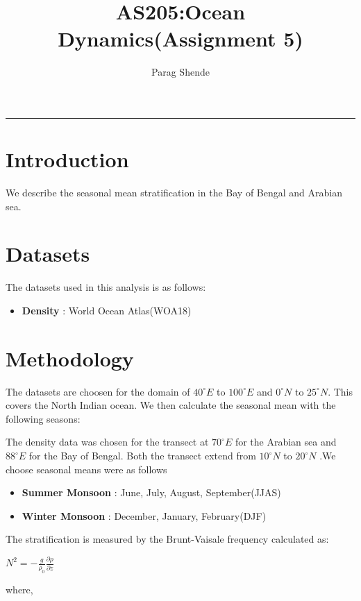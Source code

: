 \documentclass[20pt]{article}
\title{AS205:Ocean Dynamics(Assignment 5)}
\author{Parag Shende}
\begin{document}
\maketitle
\hrule

\section*{Introduction}

We describe the seasonal mean stratification in the Bay of Bengal and Arabian sea. 

\section*{Datasets}

The datasets used in this analysis is as follows:

\begin{itemize}
    \item \textbf{Density} : World Ocean Atlas(WOA18)
\end{itemize}

\section*{Methodology}

The datasets are choosen for the domain of $40^{\circ} E$ to $100^{\circ}E$ and $0^{\circ} N$ to $25^{\circ} N$. This covers the
North Indian ocean. We then calculate the seasonal mean with the following seasons:

The density data was chosen for the transect at $70^{\circ} E$ for the Arabian sea and $88^{\circ} E$ for the Bay of Bengal. Both the 
transect extend from $10^{\circ} N$ to $20^{\circ} N$ .We choose seasonal means were as follows 

\begin{itemize}
    \item \textbf{Summer Monsoon} : June, July, August, September(JJAS)
    \item \textbf{Winter Monsoon} : December, January, February(DJF)
\end{itemize}

The stratification is measured by the Brunt-Vaisale frequency calculated as:

\begin{center}
   $N^{2} = - \frac{g}{\rho_{0}} \frac{\partial\rho}{\partial z}$
\end{center}

where,
\end{document}
